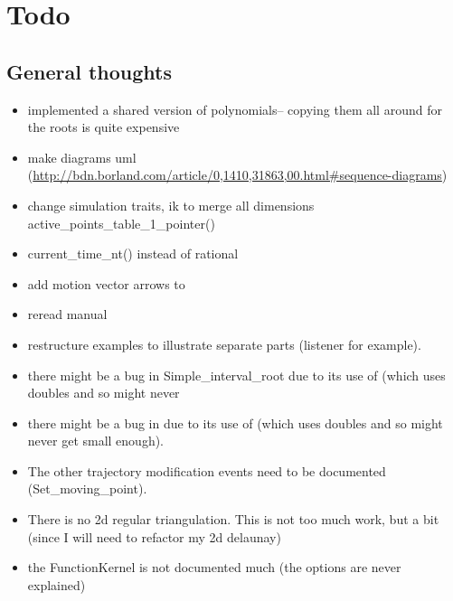 \section{Todo}

\subsection{General thoughts}

\begin{itemize}

\item implemented a shared version of polynomials-- copying them all around for the roots is quite expensive

\item make diagrams uml (\url{http://bdn.borland.com/article/0,1410,31863,00.html#sequence-diagrams})

\item change simulation traits, ik to merge all dimensions active\_points\_table\_1\_pointer()

\item current\_time\_nt() instead of rational

\item add motion vector arrows to 

\item reread manual

\item restructure examples to illustrate separate parts (listener for example).

\item there might be a bug in Simple\_interval\_root due to its use of
   (which uses doubles and so might never

\item there might be a bug in  due to its use of
   (which uses doubles and so might never
  get small enough).

\item The other trajectory modification events need to be documented
  (Set\_moving\_point). 

\item There is no 2d regular triangulation. This is not too much work,
  but a bit (since I will need to refactor my 2d delaunay)

\item the FunctionKernel is not documented much (the options are never
  explained)


\end{itemize}
